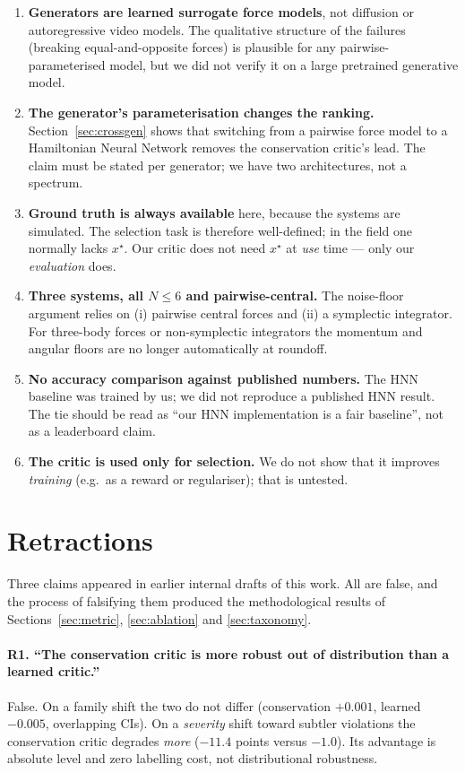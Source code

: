 \documentclass[11pt]{article}
\begin{document}
\begin{enumerate}
  \item \textbf{Generators are learned surrogate force models}, not diffusion or
    autoregressive video models. The qualitative structure of the failures (breaking
    equal-and-opposite forces) is plausible for any pairwise-parameterised model, but we
    did not verify it on a large pretrained generative model.
  \item \textbf{The generator's parameterisation changes the ranking.}
    Section~\ref{sec:crossgen} shows that switching from a pairwise force model to a
    Hamiltonian Neural Network removes the conservation critic's lead. The claim must be
    stated per generator; we have two architectures, not a spectrum.
  \item \textbf{Ground truth is always available} here, because the systems are
    simulated. The selection task is therefore well-defined; in the field one normally
    lacks $x^{\star}$. Our critic does not need $x^{\star}$ at \emph{use} time --- only
    our \emph{evaluation} does.
  \item \textbf{Three systems, all $N \leq 6$ and pairwise-central.} The noise-floor
    argument relies on (i) pairwise central forces and (ii) a symplectic integrator. For
    three-body forces or non-symplectic integrators the momentum and angular floors are
    no longer automatically at roundoff.
  \item \textbf{No accuracy comparison against published numbers.} The HNN baseline was
    trained by us; we did not reproduce a published HNN result. The tie should be read
    as ``our HNN implementation is a fair baseline'', not as a leaderboard claim.
  \item \textbf{The critic is used only for selection.} We do not show that it improves
    \emph{training} (e.g.\ as a reward or regulariser); that is untested.
\end{enumerate}

\section{Retractions}
\label{sec:retractions}

Three claims appeared in earlier internal drafts of this work. All are false, and the
process of falsifying them produced the methodological results of
Sections~\ref{sec:metric}, \ref{sec:ablation} and \ref{sec:taxonomy}.

\paragraph{R1. ``The conservation critic is more robust out of distribution than a
learned critic.''} False. On a family shift the two do not differ (conservation
$+0.001$, learned $-0.005$, overlapping CIs). On a \emph{severity} shift toward subtler
violations the conservation critic degrades \emph{more} ($-11.4$ points versus $-1.0$).
Its advantage is absolute level and zero labelling cost, not distributional robustness.
\end{document}
